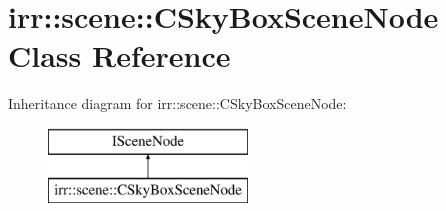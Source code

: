 \hypertarget{classirr_1_1scene_1_1_c_sky_box_scene_node}{\section{irr\-:\-:scene\-:\-:C\-Sky\-Box\-Scene\-Node Class Reference}
\label{classirr_1_1scene_1_1_c_sky_box_scene_node}
}
Inheritance diagram for irr\-:\-:scene\-:\-:C\-Sky\-Box\-Scene\-Node\-:\begin{figure}[H]
\begin{center}
\leavevmode
\includegraphics[height=2.000000cm]{classirr_1_1scene_1_1_c_sky_box_scene_node}
\end{center}
\end{figure}
